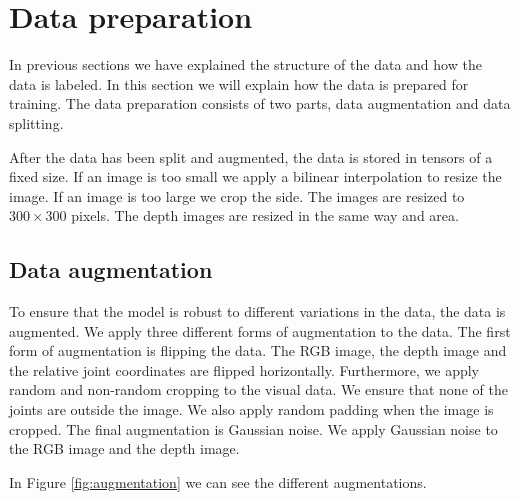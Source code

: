 \section{Data preparation}
\label{sec:data_preparation}

In previous sections we have explained the structure of the data and how the data is labeled. In this section we will explain how the data is prepared for training. The data preparation consists of two parts, data augmentation and data splitting.

After the data has been split and augmented, the data is stored in tensors of a fixed size. If an image is too small we apply a bilinear interpolation to resize the image. If an image is too large we crop the side. The images are resized to $300 \times 300$ pixels. The depth images are resized in the same way and area.

\subsection{Data augmentation}
\label{sec:data_augmentation}

To ensure that the model is robust to different variations in the data, the data is augmented. We apply three different forms of augmentation to the data. The first form of augmentation is flipping the data. The RGB image, the depth image and the relative joint coordinates are flipped horizontally. Furthermore, we apply random and non-random cropping to the visual data. We ensure that none of the joints are outside the image. We also apply random padding when the image is cropped. The final augmentation is Gaussian noise. We apply Gaussian noise to the RGB image and the depth image.

In Figure \ref{fig:augmentation} we can see the different augmentations.


